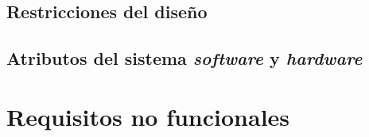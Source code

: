 \subsection{Restricciones del diseño}


\subsection{Atributos del sistema \textit{software} y \textit{hardware}}


\section{Requisitos no funcionales}


\appendix

